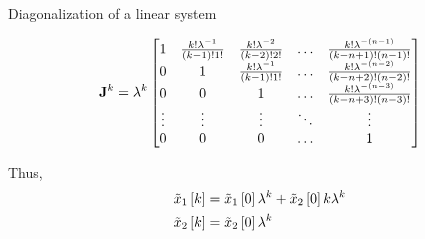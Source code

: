 \documentclass[aspectratio=169]{beamer}
\def\mf{\ensuremath\mathbf}
\def\lp{\ensuremath\left(}
\def\rp{\ensuremath\right)}
\def\ls{\ensuremath\left[}
\def\rs{\ensuremath\right]}
\def\emx{\ensuremath\end{bmatrix*}}
\def\bmxc{\ensuremath\begin{bmatrix*}[c]}
\newcommand{\dt}[1]{\ls #1\rs}
\begin{document}
\begin{frame}[t]{Diagonalization of a linear system}
\begin{scriptsize}
{{        \[ \mf{J}^k = \lambda^k \bmxc 
        1 & \frac{k!\lambda^{-1}}{\lp k-1\rp!1!} & \frac{k!\lambda^{-2}}{\lp k-2\rp! 2!} & \ldots & \frac{k!\lambda^{-\lp n - 1\rp}}{\lp k-n+1\rp! \lp n - 1\rp!}\\ 
        0 & 1 & \frac{k!\lambda^{-1}}{\lp k-1\rp! 1!} & \ldots & \frac{k!\lambda^{-\lp n - 2\rp}}{\lp k-n+2\rp! \lp n - 2\rp!}\\
        0 & 0 & 1 & \ldots & \frac{k!\lambda^{-\lp n - 3\rp}}{\lp k-n+3\rp! \lp n - 3\rp!}\\
        \vdots & \vdots & \vdots & \ddots & \vdots\\
        0 & 0 & 0 & \ldots & 1
        \emx \]\vspace{-0.25cm}

        Thus, \vspace{-0.25cm}
        \[ \begin{split}
        \tilde{x}_1\dt{k} &= \tilde{x}_1\dt{0}\lambda^k + \tilde{x}_2\dt{0}k\lambda^k\\
        \tilde{x}_2\dt{k} &= \tilde{x}_2\dt{0}\lambda^k
        \end{split} \]
    }
}
\end{scriptsize}
\end{frame}
\end{document}

